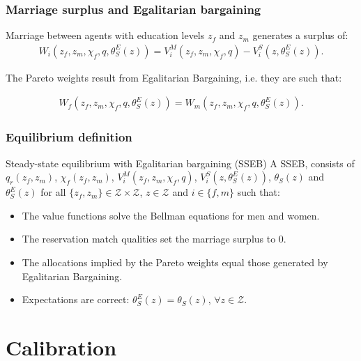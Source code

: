\documentclass{beamer}
\begin{document}
\begin{frame}
	\frametitle{Marriage surplus and Egalitarian bargaining}
	
	Marriage between agents with education levels $z_f$ and $z_m$ generates a surplus of:
	\begin{align*}
	W_i\left(z_f,z_m,\chi_f,q,\theta_{S}^E(z)\right) = V_i^M\left(z_f,z_m,\chi_f,q\right)-V_i^S\left(z,\theta_{S}^E(z)\right).
	\end{align*} 
	
	The Pareto weights result from Egalitarian Bargaining, i.e. they are such that:
	
	\begin{align*}
	W_f\left(z_f,z_m,\chi_f,q,\theta_{S}^E(z)\right) = W_m\left(z_f,z_m,\chi_f,q,\theta_{S}^E(z)\right).
	\end{align*}
	
\end{frame}

\begin{frame}
	\frametitle{Equilibrium definition}
	\begin{block}{Steady-state equilibrium with Egalitarian bargaining (SSEB)}
			A SSEB, consists of $q_r\left(z_f,z_m\right)$, $\chi_f(z_f,z_m)$, $V_i^M\left(z_f,z_m,\chi_f,q\right)$, $V_i^S\left(z,\theta_{S}^E(z)\right)$, $\theta_S(z)$ and $\theta_S^E(z)$ for all $\{z_f,z_m\}\in\mathcal{Z}\times\mathcal{Z}$, $z\in\mathcal{Z}$ and $i\in\{f,m\}$ such that: 
			\begin{itemize}
				\item The value functions solve the Bellman equations for men and women.
				\item The reservation match qualities set the marriage surplus to 0.
				\item The allocations implied by the Pareto weights equal those generated by Egalitarian Bargaining.
				\item Expectations are correct: $\theta_{S}^E(z)=\theta_{S}(z)$, $\forall z\in\mathcal{Z}$.
			\end{itemize}
			
	\end{block}

\end{frame}

\section{Calibration}
\end{document}

